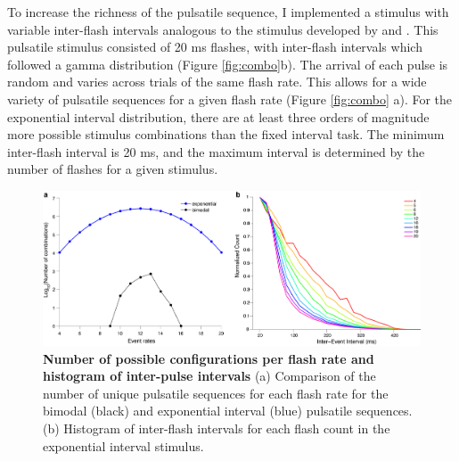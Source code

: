 To increase the richness of the pulsatile sequence, I implemented a stimulus with variable inter-flash intervals analogous to the stimulus developed by \textcite{Brunton2013} and \textcite{Scott2015SourcesRats}. This pulsatile stimulus consisted of 20 ms flashes, with inter-flash intervals which followed a gamma distribution (Figure \ref{fig:combo}b). The arrival of each pulse is random and varies across trials of the same flash rate. This allows for a wide variety of pulsatile sequences for a given flash rate (Figure \ref{fig:combo} a). For the exponential interval distribution, there are at least three orders of magnitude more possible stimulus combinations than the fixed interval task. The minimum inter-flash interval is 20 ms, and the maximum interval is determined by the number of flashes for a given stimulus. 

\begin{figure}
\centering
\includegraphics[width=\textwidth] {Figures/chapter2/combo_and_intervals.png}
\caption[Number of possible configurations per flash-rate and histogram of inter-pulse interval]{\textbf{Number of possible configurations per flash rate and histogram of inter-pulse intervals} (a) Comparison of the number of unique pulsatile sequences for each flash rate for the bimodal (black) and exponential interval (blue) pulsatile sequences. (b) Histogram of inter-flash intervals for each flash count in the exponential interval stimulus.}
  \label{fig:combo}\label{fig:stimulusprop}
\end{figure}
